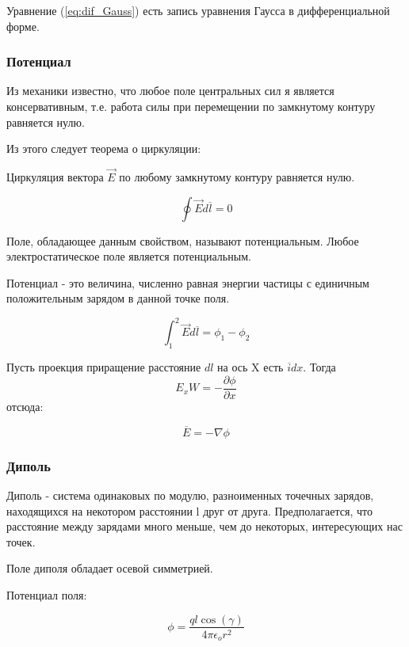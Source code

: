 Уравнение (\ref{eq:dif_Gauss}) есть запись уравнения Гаусса в дифференциальной форме.


\subsubsection{Потенциал}


Из механики известно, что любое поле центральных сил я является консервативным, т.е. работа силы при перемещении по замкнутому контуру равняется нулю.

Из этого следует теорема о циркуляции:

Циркуляция вектора $\overrightarrow{E}$ по любому замкнутому контуру равняется нулю.

\begin{equation}
\oint \overrightarrow{E} d \overline{l} = 0 
\end{equation}

Поле, обладающее данным свойством, называют потенциальным.
Любое электростатическое поле является потенциальным.

Потенциал - это величина, численно равная энергии частицы с единичным положительным зарядом в данной точке поля.

\begin{equation}
\int_1^2 \overrightarrow{E} d \overline{l} = \phi_1 - \phi_2
\end{equation}

Пусть проекция приращение расстояние $dl$ на ось X есть $\overline{i} dx$. Тогда
\[E_xW = - \frac{\partial \phi}{\partial x}\] 
отсюда:

\begin{equation}
\overline{E} =  - \nabla \phi
\end{equation}

\subsubsection{Диполь}

Диполь - система одинаковых по модулю, разноименных точечных зарядов, находящихся на некотором расстоянии l друг от друга.
Предполагается, что расстояние между зарядами много меньше, чем до некоторых, интересующих нас точек.

Поле диполя обладает осевой симметрией.

Потенциал поля:


\begin{equation}
\phi = \frac{q l \cos(\gamma)}{4 \pi \epsilon_o r^2}
\end{equation}

